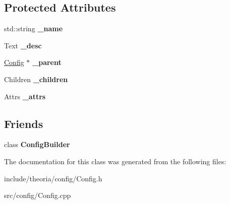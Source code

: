 \subsection*{Protected Attributes}
\begin{DoxyCompactItemize}
\item 
\mbox{\label{classtheoria_1_1config_1_1Config_a3a4838b605d99ce710ec0ad4c5285e5d}} 
std\+::string {\bfseries \+\_\+name}
\item 
\mbox{\label{classtheoria_1_1config_1_1Config_ab73d2f2163ddb788e877900ed075273e}} 
Text {\bfseries \+\_\+desc}
\item 
\mbox{\label{classtheoria_1_1config_1_1Config_aecbf5fc3dcb43d90e8ebffd0650c3831}} 
\hyperlink{classtheoria_1_1config_1_1Config}{Config} $\ast$ {\bfseries \+\_\+parent}
\item 
\mbox{\label{classtheoria_1_1config_1_1Config_a51f52887f1e69984334896dc61b5846f}} 
Children {\bfseries \+\_\+children}
\item 
\mbox{\label{classtheoria_1_1config_1_1Config_a9ffb513d50db0712eb085f22c2c102b2}} 
Attrs {\bfseries \+\_\+attrs}
\end{DoxyCompactItemize}
\subsection*{Friends}
\begin{DoxyCompactItemize}
\item 
\mbox{\label{classtheoria_1_1config_1_1Config_a3d61732fded713b38fc7f9fe3d80e2ae}} 
class {\bfseries Config\+Builder}
\end{DoxyCompactItemize}


The documentation for this class was generated from the following files\+:\begin{DoxyCompactItemize}
\item 
include/theoria/config/Config.\+h\item 
src/config/Config.\+cpp\end{DoxyCompactItemize}
